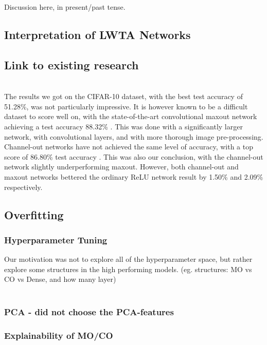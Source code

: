 Discussion here, in present/past tense.

\subsection{Interpretation of LWTA Networks}


\subsection{Link to existing research}
     \\
    The results we got on the CIFAR-10 dataset, with the best test accuracy of 51.28\%, was not particularly impressive. It is however known to be a difficult dataset to score well on, with the state-of-the-art convolutional maxout network achieving a test accuracy 88.32\% \citep{Maxout_Networks}. This was done with a significantly larger network, with convolutional layers, and with more thorough image pre-processing. Channel-out networks have not achieved the same level of accuracy, with a top score of 86.80\% test accuracy \citep{Wang}. This was also our conclusion, with the channel-out network slightly underperforming maxout. However, both channel-out and maxout networks bettered the ordinary ReLU network result by 1.50\% and 2.09\% respectively.



\subsection{Overfitting}


\subsubsection{Hyperparameter Tuning}
    Our motivation was not to explore all of the hyperparameter space, but rather explore some structures in the high performing models. (eg. structures: MO vs CO vs Dense, and how many layer)
     \\
     \\

\subsubsection{PCA - did not choose the PCA-features}

\subsubsection{Explainability of MO/CO}
